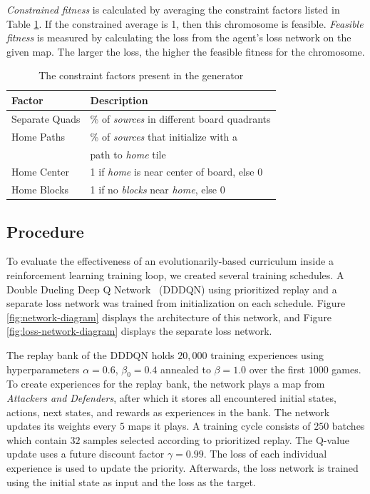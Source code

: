 \documentclass[letterpaper]{article} %
\begin{document}
\emph{Constrained fitness} is calculated by averaging the constraint factors listed in Table \ref{table:constraint-factors}. If the constrained average is 1, then this chromosome is feasible. 
\emph{Feasible fitness} is measured by calculating the loss from the agent's loss network on the given map. The larger the loss, the higher the feasible fitness for the chromosome.

\begin{table}[tpb]
\begin{tabular}{|l|l|}
\hline
\textbf{Factor} & \textbf{Description}                                       \\ \hline
Separate Quads  & \% of \textit{sources} in different board quadrants               \\ \hline
Home Paths      & \% of \textit{sources} that initialize with a\\ & path to \textit{home} tile          \\ \hline
Home Center     & 1 if \textit{home} is near center of board, else 0                  \\ \hline
Home Blocks     & 1 if no \textit{blocks} near \textit{home}, else 0 \\ \hline
\end{tabular}
\caption{The constraint factors present in the generator}
\label{table:constraint-factors}
\end{table}

\subsection{Procedure}\label{sec:case-procedure}
To evaluate the effectiveness of an evolutionarily-based curriculum inside a reinforcement learning training loop, we created several training schedules. A Double Dueling Deep Q Network~\cite{wang2016dueling} (DDDQN) using prioritized replay and a separate loss network was trained from initialization on each schedule. Figure \ref{fig:network-diagram} displays the architecture of this network, and Figure \ref{fig:loss-network-diagram} displays the separate loss network. 

The replay bank of the DDDQN holds $20,000$ training experiences using hyperparameters $\alpha=0.6$, $\beta_{0}=0.4$ annealed to $\beta=1.0$ over the first $1000$ games. To create experiences for the replay bank, the network plays a map from \emph{Attackers and Defenders}, after which it stores all encountered initial states, actions, next states, and rewards as experiences in the bank. The network updates its weights every $5$ maps it plays. A training cycle consists of $250$ batches which contain $32$ samples selected according to prioritized replay. The Q-value update uses a future discount factor $\gamma=0.99$. The loss of each individual experience is used to update the priority. Afterwards, the loss network is trained using the initial state as input and the loss as the target.
\end{document}
